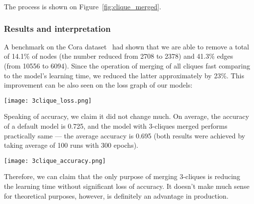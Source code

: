 The process is shown on Figure~\ref{fig:clique_merged}.

\subsubsection*{Results and interpretation}

A benchmark on the Cora dataset~\cite{cora_dataset} had shown that we are able to remove a total of 14.1\% of nodes (the number reduced from 2708 to 2378) and 41.3\% edges (from 10556 to 6094).
Since the operation of merging of all cliques fast comparing to the model's learning time, we reduced the latter approximately by 23\%.
This improvement can be also seen on the loss graph of our models:

\texttt{[image: 3clique\_loss.png]}

Speaking of accuracy, we claim it did not change much.
On average, the accuracy of a default model is 0.725, and the model with 3-cliques merged performs practically same --- the average accuracy is 0.695 (both results were achieved by taking average of 100 runs with 300 epochs).

\texttt{[image: 3clique\_accuracy.png]}

Therefore, we can claim that the only purpose of merging 3-cliques is reducing the learning time without significant loss of accuracy.
It doesn't make much sense for theoretical purposes, however, is definitely an advantage in production.

